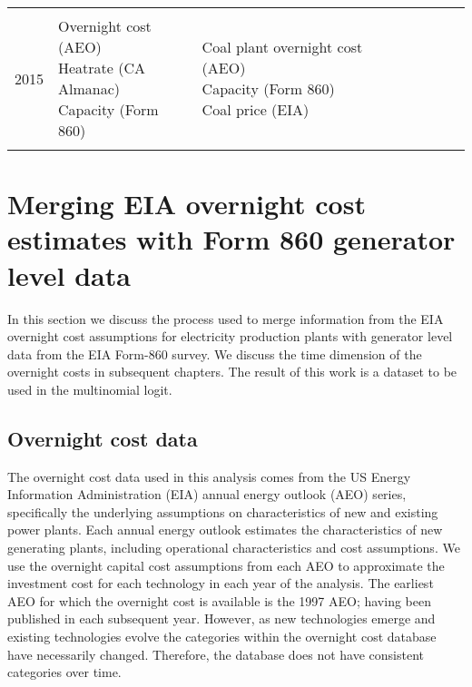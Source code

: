 \documentclass[10pt]{report}
\begin{document}
\begin{scriptsize}
\begin{landscape}
\begin{center}
\begin{longtable}{|lllllllll|}
\hline \\
2015 & \shortstack{Overnight cost (AEO) \\ Heatrate (CA Almanac) \\ Capacity (Form 860)} &
\shortstack{Coal plant overnight cost (AEO) \\ Capacity (Form 860) \\ Coal price (EIA)} & \\
\\

\hline 
\end{longtable}
\end{center}
\end{landscape}
\end{scriptsize}
\endgroup
\newpage
\restoregeometry


\chapter{Merging EIA overnight cost estimates with Form 860 generator level data}\label{ch_mapping}
In this section we discuss the process used to merge information from the EIA overnight cost assumptions for electricity production plants with generator level data from the EIA Form-860 survey.  
We discuss the time dimension of the overnight costs in subsequent chapters. 
The result of this work is a dataset to be used in the multinomial logit.

\section{Overnight cost data}
The overnight cost data used in this analysis comes from the US Energy Information Administration (EIA) annual energy outlook (AEO) series, specifically the underlying assumptions on characteristics of new and existing power plants. 
Each annual energy outlook estimates the characteristics of new generating plants, including operational characteristics and cost assumptions.
We use the overnight capital cost assumptions from each AEO to approximate the investment cost for each technology in each year of the analysis.
The earliest AEO for which the overnight cost is available is the 1997 AEO; having been published in each subsequent year.
However, as new technologies emerge and existing technologies evolve the categories within the overnight cost database have necessarily changed. 
Therefore, the database does not have consistent categories over time. 
\end{document}
